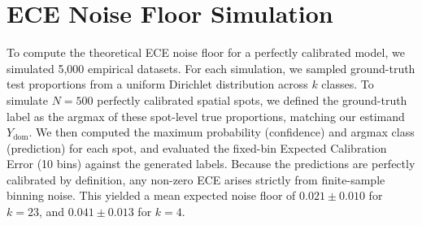 \documentclass{jmlr} %
\begin{document}
\section{ECE Noise Floor Simulation}
\label{app:noise_floor}
To compute the theoretical ECE noise floor for a perfectly calibrated model, we simulated 5,000 empirical datasets. For each simulation, we sampled ground-truth test proportions from a uniform Dirichlet distribution across $k$ classes. To simulate $N=500$ perfectly calibrated spatial spots, we defined the ground-truth label as the argmax of these spot-level true proportions, matching our estimand $Y_{\text{dom}}$. We then computed the maximum probability (confidence) and argmax class (prediction) for each spot, and evaluated the fixed-bin Expected Calibration Error (10 bins) against the generated labels. Because the predictions are perfectly calibrated by definition, any non-zero ECE arises strictly from finite-sample binning noise. This yielded a mean expected noise floor of $0.021 \pm 0.010$ for $k=23$, and $0.041 \pm 0.013$ for $k=4$.
\end{document}

